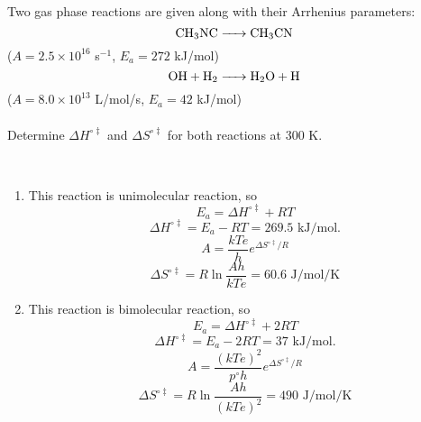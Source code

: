 \item Two gas phase reactions are given along with their Arrhenius parameters:
\begin{equation*}
    \ce{CH_3NC -> CH_3CN}
\end{equation*}
($A=2.5\times10^{16}$ s$^{-1}$, $E_a=272$ kJ/mol)
\begin{equation*}
    \ce{OH +H_2 -> H_2O + H}
\end{equation*}
($A=8.0\times10^{13}$ L/mol/s, $E_a=42$ kJ/mol)\\\\
Determine $\Delta H^{\circ\ddagger}$ and $\Delta S^{\circ\ddagger}$ for both reactions at 300 K.

\begin{solution}\
    \begin{enumerate}
        \item This reaction is unimolecular reaction, so
              \begin{equation*}
                  E_a=\Delta H^{\circ\ddagger}+RT
              \end{equation*}
              \begin{equation*}
                  \Delta H^{\circ\ddagger}=E_a-RT=269.5\text{ kJ/mol}.
              \end{equation*}
              \begin{equation*}
                  A=\frac{kTe}{h}e^{\Delta S^{\circ\ddagger}/R}
              \end{equation*}
              \begin{equation*}
                  \Delta S^{\circ\ddagger}=R\ln\frac{Ah}{kTe}=60.6\text{ J/mol/K}
              \end{equation*}
        \item This reaction is bimolecular reaction, so
              \begin{equation*}
                  E_a=\Delta H^{\circ\ddagger}+2RT
              \end{equation*}
              \begin{equation*}
                  \Delta H^{\circ\ddagger}=E_a-2RT=37\text{ kJ/mol}.
              \end{equation*}
              \begin{equation*}
                  A=\frac{(kTe)^2}{p^\circ h}e^{\Delta S^{\circ\ddagger}/R}
              \end{equation*}
              \begin{equation*}
                  \Delta S^{\circ\ddagger}=R\ln\frac{Ah}{(kTe)^2}=490\text{ J/mol/K}
              \end{equation*}
    \end{enumerate}
\end{solution}